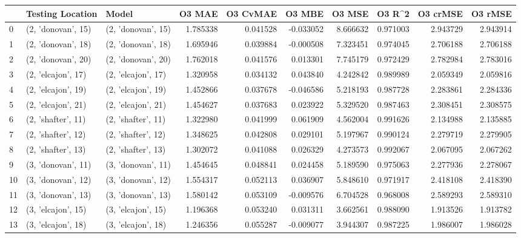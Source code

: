 \begin{tabular}{lllrrrrrrr}
\toprule
{} &    Testing Location &               Model &    O3 MAE &  O3 CvMAE &    O3 MBE &     O3 MSE &    O3 R\textasciicircum2 &  O3 crMSE &   O3 rMSE \\
\midrule
0  &  (2, 'donovan', 15) &  (2, 'donovan', 15) &  1.785338 &  0.041528 & -0.033052 &   8.666632 &  0.971003 &  2.943729 &  2.943914 \\
1  &  (2, 'donovan', 18) &  (2, 'donovan', 18) &  1.695946 &  0.039884 & -0.000508 &   7.323451 &  0.974045 &  2.706188 &  2.706188 \\
2  &  (2, 'donovan', 20) &  (2, 'donovan', 20) &  1.762018 &  0.041576 &  0.013301 &   7.745179 &  0.972429 &  2.782984 &  2.783016 \\
3  &  (2, 'elcajon', 17) &  (2, 'elcajon', 17) &  1.320958 &  0.034132 &  0.043840 &   4.242842 &  0.989989 &  2.059349 &  2.059816 \\
4  &  (2, 'elcajon', 19) &  (2, 'elcajon', 19) &  1.452866 &  0.037678 & -0.046586 &   5.218193 &  0.987728 &  2.283861 &  2.284336 \\
5  &  (2, 'elcajon', 21) &  (2, 'elcajon', 21) &  1.454627 &  0.037683 &  0.023922 &   5.329520 &  0.987463 &  2.308451 &  2.308575 \\
6  &  (2, 'shafter', 11) &  (2, 'shafter', 11) &  1.322980 &  0.041999 &  0.061909 &   4.562004 &  0.991626 &  2.134988 &  2.135885 \\
7  &  (2, 'shafter', 12) &  (2, 'shafter', 12) &  1.348625 &  0.042808 &  0.029101 &   5.197967 &  0.990124 &  2.279719 &  2.279905 \\
8  &  (2, 'shafter', 13) &  (2, 'shafter', 13) &  1.302072 &  0.041088 &  0.026329 &   4.273573 &  0.992067 &  2.067095 &  2.067262 \\
9  &  (3, 'donovan', 11) &  (3, 'donovan', 11) &  1.454645 &  0.048841 &  0.024458 &   5.189590 &  0.975063 &  2.277936 &  2.278067 \\
10 &  (3, 'donovan', 12) &  (3, 'donovan', 12) &  1.554317 &  0.052113 &  0.036907 &   5.848610 &  0.971917 &  2.418108 &  2.418390 \\
11 &  (3, 'donovan', 13) &  (3, 'donovan', 13) &  1.580142 &  0.053109 & -0.009576 &   6.704528 &  0.968008 &  2.589293 &  2.589310 \\
12 &  (3, 'elcajon', 15) &  (3, 'elcajon', 15) &  1.196368 &  0.053240 &  0.031311 &   3.662561 &  0.988090 &  1.913526 &  1.913782 \\
13 &  (3, 'elcajon', 18) &  (3, 'elcajon', 18) &  1.246356 &  0.055287 & -0.009077 &   3.944307 &  0.987225 &  1.986007 &  1.986028 \\

\end{tabular}
